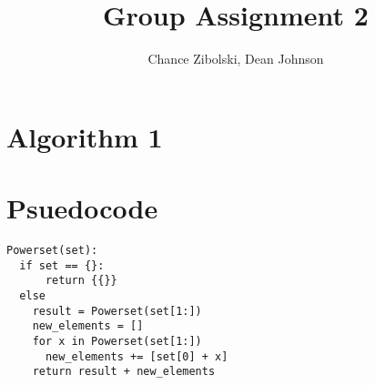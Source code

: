 \documentclass{article}
\title{Group Assignment 2}
\author{Chance Zibolski, Dean Johnson}
\begin{document}
\maketitle

\section*{Algorithm 1}

\section*{Psuedocode}

\begin{verbatim}
Powerset(set):
  if set == {}:
      return {{}}
  else
    result = Powerset(set[1:])
    new_elements = []
    for x in Powerset(set[1:])
      new_elements += [set[0] + x]
    return result + new_elements
\end{verbatim}
\end{document}
